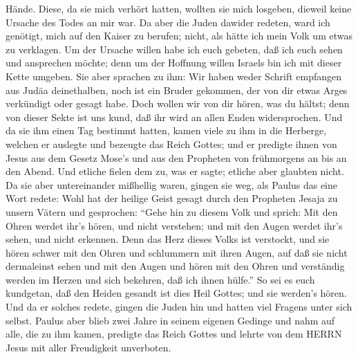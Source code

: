 Hände.  Diese, da sie mich verhört hatten, wollten sie mich
losgeben, dieweil keine Ursache des Todes an mir war.  Da
aber die Juden dawider redeten, ward ich genötigt, mich auf den Kaiser
zu berufen; nicht, als hätte ich mein Volk um etwas zu verklagen.
 Um der Ursache willen habe ich euch gebeten, daß ich euch
sehen und ansprechen möchte; denn um der Hoffnung willen Israels bin ich
mit dieser Kette umgeben.  Sie aber sprachen zu ihm: Wir
haben weder Schrift empfangen aus Judäa deinethalben, noch ist ein
Bruder gekommen, der von dir etwas Arges verkündigt oder gesagt habe.
 Doch wollen wir von dir hören, was du hältst; denn von
dieser Sekte ist uns kund, daß ihr wird an allen Enden widersprochen.
 Und da sie ihm einen Tag bestimmt hatten, kamen viele zu
ihm in die Herberge, welchen er auslegte und bezeugte das Reich Gottes;
und er predigte ihnen von Jesus aus dem Gesetz Mose's und aus den
Propheten von frühmorgens an bis an den Abend.  Und etliche
fielen dem zu, was er sagte; etliche aber glaubten nicht. 
Da sie aber untereinander mißhellig waren, gingen sie weg, als Paulus
das eine Wort redete: Wohl hat der heilige Geist gesagt durch den
Propheten Jesaja zu unsern Vätern  und gesprochen: ``Gehe
hin zu diesem Volk und sprich: Mit den Ohren werdet ihr's hören, und
nicht verstehen; und mit den Augen werdet ihr's sehen, und nicht
erkennen.  Denn das Herz dieses Volks ist verstockt, und
sie hören schwer mit den Ohren und schlummern mit ihren Augen, auf daß
sie nicht dermaleinst sehen und mit den Augen und hören mit den Ohren
und verständig werden im Herzen und sich bekehren, daß ich ihnen
hülfe.''  So sei es euch kundgetan, daß den Heiden gesandt
ist dies Heil Gottes; und sie werden's hören.  Und da er
solches redete, gingen die Juden hin und hatten viel Fragens unter sich
selbst.  Paulus aber blieb zwei Jahre in seinem eigenen
Gedinge und nahm auf alle, die zu ihm kamen,  predigte das
Reich Gottes und lehrte von dem HERRN Jesus mit aller Freudigkeit
unverboten.
